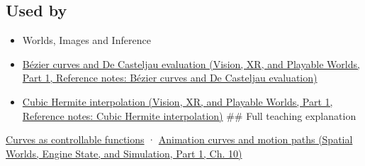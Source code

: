 \subsection{Used by}\label{appendix-f28eeec97a3d-used-by}

\hypertarget{appendix-f28eeec97a3d-used-by}{}

\begin{itemize}
\item
  {Worlds, Images and Inference}
\item
  \href{../07-Vision-XR-and-Playable-Worlds-P01/main.pdf\#appendix-ddbec701898c}{Bézier curves and De Casteljau evaluation (Vision, XR, and Playable Worlds, Part 1, Reference notes: Bézier curves and De Casteljau evaluation)}
\item
  \href{../07-Vision-XR-and-Playable-Worlds-P01/main.pdf\#appendix-db3aef8f2fd6}{Cubic Hermite interpolation (Vision, XR, and Playable Worlds, Part 1, Reference notes: Cubic Hermite interpolation)} \#\# Full teaching explanation
\end{itemize}

\hyperref[03-visual-computing-i-ch001-curves-as-controllable-functions]{Curves as controllable functions} · \href{../05-Spatial-Worlds-Engine-State-and-Simulation-P01/main.pdf\#04-visual-computing-ii-ch029-animation-curves-and-motion-paths}{Animation curves and motion paths (Spatial Worlds, Engine State, and Simulation, Part 1, Ch. 10)}
